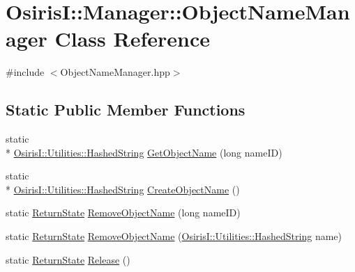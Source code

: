 \hypertarget{class_osiris_i_1_1_manager_1_1_object_name_manager}{\section{Osiris\-I\-:\-:Manager\-:\-:Object\-Name\-Manager Class Reference}
\label{class_osiris_i_1_1_manager_1_1_object_name_manager}
}


{\ttfamily \#include $<$Object\-Name\-Manager.\-hpp$>$}

\subsection*{Static Public Member Functions}
\begin{DoxyCompactItemize}
\item 
static \\*
\hyperlink{class_osiris_i_1_1_utilities_1_1_hashed_string}{Osiris\-I\-::\-Utilities\-::\-Hashed\-String} \hyperlink{class_osiris_i_1_1_manager_1_1_object_name_manager_a943dd5d064c7a05899b954426e04e554}{Get\-Object\-Name} (long name\-I\-D)
\item 
static \\*
\hyperlink{class_osiris_i_1_1_utilities_1_1_hashed_string}{Osiris\-I\-::\-Utilities\-::\-Hashed\-String} \hyperlink{class_osiris_i_1_1_manager_1_1_object_name_manager_af032a37320cf8eb48a9b6f18c279e492}{Create\-Object\-Name} ()
\item 
static \hyperlink{namespace_osiris_i_a8f53bf938dc75c65c6a529694514013e}{Return\-State} \hyperlink{class_osiris_i_1_1_manager_1_1_object_name_manager_a16924f60b2045948850a880b47e3940a}{Remove\-Object\-Name} (long name\-I\-D)
\item 
static \hyperlink{namespace_osiris_i_a8f53bf938dc75c65c6a529694514013e}{Return\-State} \hyperlink{class_osiris_i_1_1_manager_1_1_object_name_manager_a5bfb4b349e3f545aa8e0e8ac0d627fc3}{Remove\-Object\-Name} (\hyperlink{class_osiris_i_1_1_utilities_1_1_hashed_string}{Osiris\-I\-::\-Utilities\-::\-Hashed\-String} name)
\item 
static \hyperlink{namespace_osiris_i_a8f53bf938dc75c65c6a529694514013e}{Return\-State} \hyperlink{class_osiris_i_1_1_manager_1_1_object_name_manager_a8b58b027922085c2f0c81e0c1958dd45}{Release} ()
\end{DoxyCompactItemize}


